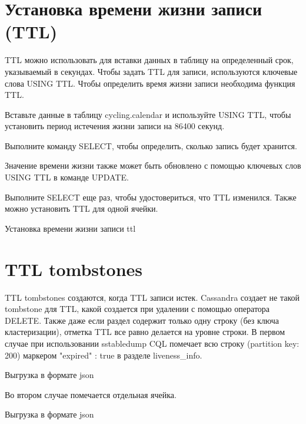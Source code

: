 \section{Установка времени жизни записи (TTL)}

TTL можно использовать для вставки данных в таблицу на определенный
срок, указываемый в секундах. Чтобы задать TTL для записи, используются
ключевые слова USING TTL. Чтобы определить время жизни записи
необходима функция TTL.\par
Вставьте данные в таблицу cycling.calendar и используйте USING
TTL, чтобы установить период истечения жизни записи на 86400 секунд.\par
Выполните команду SELECT, чтобы определить, сколько запись будет
хранится.\par
Значение времени жизни также может быть обновлено с помощью
ключевых слов USING TTL в команде UPDATE.\par
Выполните SELECT еще раз, чтобы удостовериться, что TTL изменился.
Также можно установить TTL для одной ячейки.

\begin{image}
	\caption{Установка времени жизни записи ttl}
	\label{fig:ttl}
\end{image}

\section{TTL tombstones}

TTL tombstones создаются, когда TTL записи истек. Cassandra создает не
такой tombstone для TTL, какой создается при удалении с помощью оператора
DELETE. Также даже если раздел содержит только одну строку (без ключа
кластеризации), отметка TTL все равно делается на уровне строки.
В первом случае при использовании sstabledump CQL помечает всю
строку (partition key: 200) маркером "expired" : true в разделе liveness\_info.

\begin{image}
	\caption{Выгрузка в формате json}
	\label{fig:tombstones:cycling}
\end{image}

Во втором случае помечается отдельная ячейка.

\begin{image}
	\caption{Выгрузка в формате json}
	\label{fig:tombstone:rank-by-year-and-name}
\end{image}

